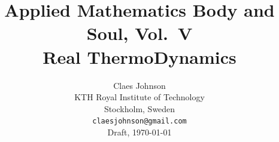\documentclass[12pt]{book}
\begin{document}
\title{
{\normalsize\rm Applied Mathematics Body and Soul, Vol.~V}\\[0.6em]
\sc Real ThermoDynamics}

\author{\sc Claes Johnson\\
\bigskip
\small KTH Royal Institute of Technology\\
\small Stockholm, Sweden\\
\bigskip
\small \texttt{claesjohnson@gmail.com}\\
\bigskip
\small Draft, \today}
\date{}
\maketitle


%
\tableofcontents
\cleardoublepage
{}




%
%
%

%
%
%
%
%
%
%
\small
\printindex
\end{document}
